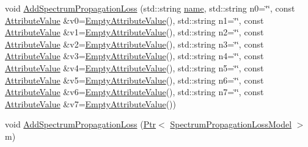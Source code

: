 \begin{DoxyCompactItemize}
void \hyperlink{classns3_1_1SpectrumChannelHelper_a135e8ad3b8399671db56d112929f9611}{Add\+Spectrum\+Propagation\+Loss} (std\+::string \hyperlink{generate__test__data__lte__spectrum__model_8m_ab74e6bf80237ddc4109968cedc58c151}{name}, std\+::string n0=\char`\"{}\char`\"{}, const \hyperlink{classns3_1_1AttributeValue}{Attribute\+Value} \&v0=\hyperlink{classns3_1_1EmptyAttributeValue}{Empty\+Attribute\+Value}(), std\+::string n1=\char`\"{}\char`\"{}, const \hyperlink{classns3_1_1AttributeValue}{Attribute\+Value} \&v1=\hyperlink{classns3_1_1EmptyAttributeValue}{Empty\+Attribute\+Value}(), std\+::string n2=\char`\"{}\char`\"{}, const \hyperlink{classns3_1_1AttributeValue}{Attribute\+Value} \&v2=\hyperlink{classns3_1_1EmptyAttributeValue}{Empty\+Attribute\+Value}(), std\+::string n3=\char`\"{}\char`\"{}, const \hyperlink{classns3_1_1AttributeValue}{Attribute\+Value} \&v3=\hyperlink{classns3_1_1EmptyAttributeValue}{Empty\+Attribute\+Value}(), std\+::string n4=\char`\"{}\char`\"{}, const \hyperlink{classns3_1_1AttributeValue}{Attribute\+Value} \&v4=\hyperlink{classns3_1_1EmptyAttributeValue}{Empty\+Attribute\+Value}(), std\+::string n5=\char`\"{}\char`\"{}, const \hyperlink{classns3_1_1AttributeValue}{Attribute\+Value} \&v5=\hyperlink{classns3_1_1EmptyAttributeValue}{Empty\+Attribute\+Value}(), std\+::string n6=\char`\"{}\char`\"{}, const \hyperlink{classns3_1_1AttributeValue}{Attribute\+Value} \&v6=\hyperlink{classns3_1_1EmptyAttributeValue}{Empty\+Attribute\+Value}(), std\+::string n7=\char`\"{}\char`\"{}, const \hyperlink{classns3_1_1AttributeValue}{Attribute\+Value} \&v7=\hyperlink{classns3_1_1EmptyAttributeValue}{Empty\+Attribute\+Value}())
\item 
void \hyperlink{classns3_1_1SpectrumChannelHelper_ae25cfc09b6fe9b9bf36b1835eee52547}{Add\+Spectrum\+Propagation\+Loss} (\hyperlink{classns3_1_1Ptr}{Ptr}$<$ \hyperlink{classns3_1_1SpectrumPropagationLossModel}{Spectrum\+Propagation\+Loss\+Model} $>$ m)
\item 

\end{DoxyCompactItemize}
